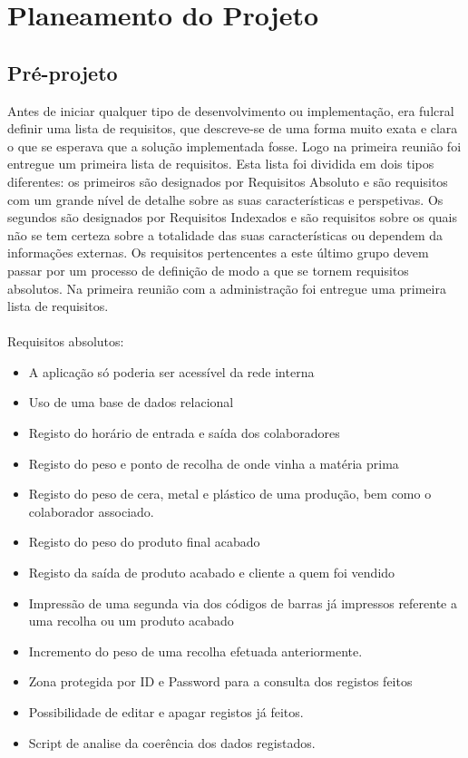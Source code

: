 \chapter{Planeamento do Projeto} 
\label{cap:3}

\section{Pré-projeto}
Antes de iniciar qualquer tipo de desenvolvimento ou implementação, era fulcral definir uma lista de requisitos, que descreve-se de uma forma muito exata e clara o que se esperava que a solução implementada fosse. Logo na primeira reunião foi entregue um primeira lista de requisitos. Esta lista foi dividida em dois tipos diferentes: os primeiros são designados por Requisitos Absoluto e são requisitos com um grande nível de detalhe sobre as suas características e perspetivas. Os segundos são designados por Requisitos Indexados e são requisitos sobre os quais não se tem certeza sobre a totalidade das suas características ou dependem da informações externas. Os requisitos pertencentes a este último grupo devem passar por um processo de definição de modo a que se tornem requisitos absolutos.
Na primeira reunião com a administração foi entregue uma primeira lista de requisitos.\\
\\
Requisitos absolutos:
\begin{itemize}
	\item A aplicação só poderia ser acessível da rede interna
	\item Uso de uma base de dados relacional
	\item Registo do horário de entrada e saída dos colaboradores
	\item Registo do peso e ponto de recolha de onde vinha a matéria prima
	\item Registo do peso de cera, metal e plástico de uma produção, bem como o colaborador associado.
	\item Registo do peso do produto final acabado
	\item Registo da saída de produto acabado e cliente a quem foi vendido
	\item Impressão de uma segunda via dos códigos de barras já impressos referente a uma recolha ou um produto acabado
	\item Incremento do peso de uma recolha efetuada anteriormente.
	\item Zona protegida por ID e Password para a consulta dos registos feitos
	\item Possibilidade de editar e apagar registos já feitos.
	\item Script de analise da coerência dos dados registados.
\end{itemize}
